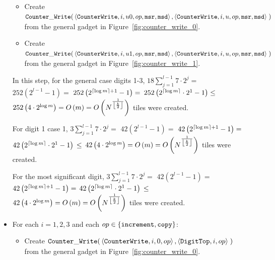 \begin{itemize}
\begin{itemize}
            \item Create
            $\begin{aligned}[t]
                \cwrite(& \left\langle {\tt CounterWrite}, i, u0, \inc, {\tt msr}, {\tt msd} \right\rangle,
                          \left\langle {\tt CounterWrite}, i, u,  \inc, {\tt msr}, {\tt msd} \right\rangle \;)
            \end{aligned}$ \\ from the general gadget in Figure~\ref{fig:counter_write_0}.

            \item Create
            $\begin{aligned}[t]
                \cwrite(& \left\langle {\tt CounterWrite}, i,  u1, \inc, {\tt msr}, {\tt msd} \right\rangle,
                          \left\langle {\tt CounterWrite}, i,  u,  \inc, {\tt msr}, {\tt msd} \right\rangle \;)
            \end{aligned}$ \\ from the general gadget in Figure~\ref{fig:counter_write_1}.
    \end{itemize}

    In this step, for the general case digits 1-3, $18 \sum_{j=1}^{l - 1} 7 \cdot 2^j =$
    $252 \left(2^{l - 1} - 1 \right) =$
    $252 \left(2^{\ceil*{\log m} + 1} - 1 \right) =$
    $252 \left(2^{\ceil*{\log m}} \cdot 2^1 - 1 \right) \leq$
    $252 \left(4 \cdot 2^{\log m} \right) = \bigom$ tiles were created.

    For digit 1 case 1,
    $3 \sum_{j=1}^{l - 1} 7 \cdot 2^j =$
    $42 \left(2^{l - 1} - 1 \right) =$
    $42 \left(2^{\ceil*{\log m} + 1} - 1 \right) =$
    $42 \left(2^{\ceil*{\log m}} \cdot 2^1 - 1 \right)\\ \leq$
    $42 \left(4 \cdot 2^{\log m} \right) = \bigom$ tiles were created.

    For the most significant digit,
    $3 \sum_{j=1}^{l - 1} 7 \cdot 2^j =$
    $42 \left(2^{l - 1} - 1 \right) =$
    $42 \left(2^{\ceil*{\log m} + 1} - 1 \right) =$
    $42 \left(2^{\ceil*{\log m}} \cdot 2^1 - 1 \right) \\\leq$
    $42 \left(4 \cdot 2^{\log m} \right) = \bigom$ tiles were created.

    \item For each $i = 1,2,3$ and each $\inc \in \{{\tt increment}, {\tt copy} \}$:
    \begin{itemize}
        \item Create
        $\begin{aligned}[t]
            \cwrite(& \left\langle {\tt CounterWrite}, i, 0, \inc \right\rangle,
                      \left\langle {\tt DigitTop},     i,    \inc \right\rangle \;)
        \end{aligned}$ \\ from the general gadget in Figure~\ref{fig:counter_write_0}.


\end{itemize}
\end{itemize}
